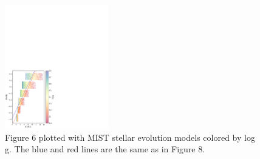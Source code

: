 \documentclass[twocolumn]{emulateapj}
\begin{document}
\begin{figure}[]
\centering
\includegraphics[width=0.4\textwidth]{f9.pdf}
\caption{Figure 6 plotted with MIST stellar evolution models colored by log g. The blue and red lines are the same as in Figure 8.}
\end{figure}
\end{document}
